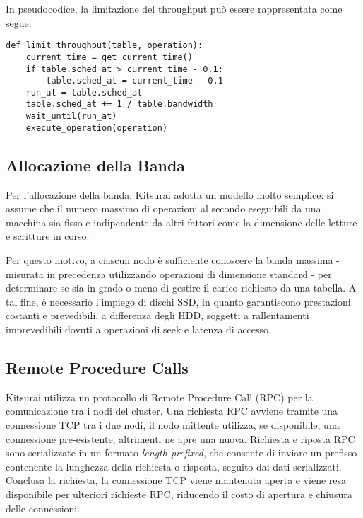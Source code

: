 \begin{samepage}
\noindent In pseudocodice, la limitazione del throughput può essere rappresentata come segue:
\begin{verbatim}
def limit_throughput(table, operation):
    current_time = get_current_time()
    if table.sched_at > current_time - 0.1:
        table.sched_at = current_time - 0.1
    run_at = table.sched_at
    table.sched_at += 1 / table.bandwidth
    wait_until(run_at)
    execute_operation(operation)
\end{verbatim}
\end{samepage}

\subsection{Allocazione della Banda}
\label{subsec:allocazione-banda}

Per l'allocazione della banda, Kitsurai adotta un modello molto semplice: si assume che il numero massimo di operazioni al secondo eseguibili da una macchina sia fisso e indipendente da altri fattori come la dimensione delle letture e scritture in corso.

Per questo motivo, a ciascun nodo è sufficiente conoscere la banda massima - misurata in precedenza utilizzando operazioni di dimensione standard - per determinare se sia in grado o meno di gestire il carico richiesto da una tabella.
A tal fine, è necessario l'impiego di dischi SSD, in quanto garantiscono prestazioni costanti e prevedibili, a differenza degli HDD, soggetti a rallentamenti imprevedibili dovuti a operazioni di seek e latenza di accesso.

\subsection{Remote Procedure Calls}
\label{subsec:rpc}

Kitsurai utilizza un protocollo di Remote Procedure Call (RPC) per la comunicazione tra i nodi del cluster.
Una richiesta RPC avviene tramite una connessione TCP tra i due nodi, il nodo mittente utilizza, se disponibile, una connessione pre-esistente, altrimenti ne apre una nuova.
Richiesta e riposta RPC sono serializzate in un formato \emph{length-prefixed}, che consente di inviare un prefisso contenente la lunghezza della richiesta o risposta, seguito dai dati serializzati.
Conclusa la richiesta, la connessione TCP viene mantenuta aperta e viene resa disponibile per ulteriori richieste RPC, riducendo il costo di apertura e chiusura delle connessioni.

